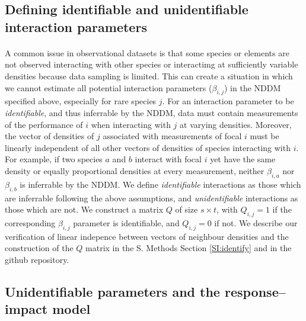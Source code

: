 \documentclass[a4,12pt]{article}
\begin{document}
\begin{refsection}
    \subsection{Defining identifiable and unidentifiable interaction parameters}
    \label{meth:id_params}

    \paragraph{}
    A common issue in observational datasets is that some species or elements are not observed interacting with other species or interactimg at sufficiently variable densities because data sampling is limited. This can create a situation in which we cannot estimate all potential interaction parameters ($\beta_{i,j}$) in the NDDM specified above, especially for rare species $j$. For an interaction parameter to be \textit{identifiable}, and thus inferrable by the NDDM, data must contain measurements of the performance of $i$ when interacting with $j$ at varying densities. Moreover, the vector of densities of $j$ associated with measurements of focal $i$ must be linearly independent of all other vectors of densities of species interacting with $i$. For example, if two species $a$ and $b$ interact with focal $i$ yet have the same density or equally proportional densities at every measurement, neither $\beta_{i, a}$ nor $\beta_{i, b}$ is inferrable by the NDDM. We define \textit{identifiable} interactions as those which are inferrable following the above assumptions, and \textit{unidentifiable} interactions as those which are not. We construct a matrix $Q$ of size $s \times t$, with $Q_{i, j} = 1$ if the corresponding $\beta_{i, j}$ parameter is identifiable, and $Q_{i, j} = 0$ if not. We describe our verification of linear indepence between vectors of neighbour densities and the construction of the $Q$ matrix in the S. Methods Section \ref{SI:identify} and in the github repository.
    
    \subsection{Unidentifiable parameters and the response--impact model}
    \label{meth:rim}


\end{refsection}
\end{document}
